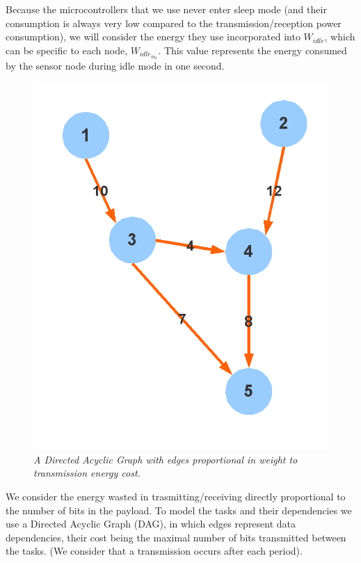Because the microcontrollers that we use never enter sleep mode (and their consumption is always very low compared to the transmission/reception
power consumption), we will consider the energy they use incorporated into $W_{idle}$, which can be specific to each node, $W_{idle_{m_k}}$. This
value represents the energy consumed by the sensor node during idle mode in one second. 

\begin{figure}[hb]
\begin{center}
 \includegraphics[scale=0.3]{static/dag.png}
\end{center}
\caption{\small \textit{A Directed Acyclic Graph with edges proportional in weight to transmission energy cost.}}

 
\end{figure}

We consider the energy wasted in trasmitting/receiving directly proportional to the number of bits in the payload. To model the tasks and their
dependencies we use a Directed Acyclic Graph (DAG), in which edges represent data dependencies, their cost being the maximal number of bits 
transmitted between the tasks.  (We consider that a transmission occurs after each period). 

